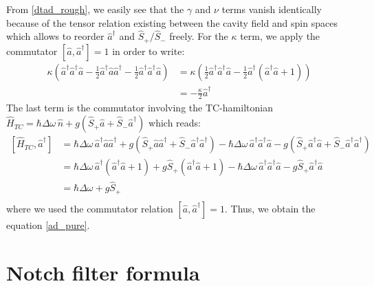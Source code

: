 \documentclass[10pt]{report}
\begin{document}
From \ref{dtad_rough}, we easily see that the $\gamma$ and $\nu$ terms vanish identically because of the tensor relation existing between the cavity field and spin spaces which allows to reorder $\hat{a}^\dag$ and $\hat{S}_+ / \hat{S}_-$ freely. For the $\kappa$ term, we apply the commutator $\left[ \hat{a}, \hat{a}^\dagger \right] = 1$ in order to write:
\begin{equation}
\begin{split}
\kappa \left( \hat{a}^\dagger \hat{a}^\dagger \hat{a} - \frac{1}{2} \hat{a}^\dagger \hat{a} \hat{a}^\dagger - \frac{1}{2} \hat{a}^\dagger \hat{a}^\dagger \hat{a} \right) &= \kappa \left( \frac{1}{2}\hat{a}^\dagger \hat{a}^\dagger \hat{a} - \frac{1}{2} \hat{a}^\dagger (\hat{a}^\dagger \hat{a} + 1) \right)\\
&= -\frac{\kappa}{2} \hat{a}^\dagger
\end{split}
\end{equation}
The last term is the commutator involving the TC-hamiltonian $\hat{H}_{TC} = \hbar\Delta\omega\,\hat{n} + g \left(\hat{S}_+ \hat{a} + \hat{S}_-\hat{a}^{\dag} \right)$ which reads:
\begin{equation}
\begin{split}
\left[ \hat{H}_{TC}, \hat{a}^\dag \right] &= \hbar\Delta\omega\,\hat{a}^\dag\hat{a}\hat{a}^\dag + g\left(\hat{S}_+ \hat{a}\hat{a}^\dag + \hat{S}_-\hat{a}^{\dag}\hat{a}^\dag \right) - \hbar\Delta\omega\,\hat{a}^\dag\hat{a}^\dag\hat{a} - g\left(\hat{S}_+ \hat{a}^\dag\hat{a} + \hat{S}_-\hat{a}^{\dag}\hat{a}^\dag \right) \\
&= \hbar\Delta\omega\,\hat{a}^\dag(\hat{a}^\dag\hat{a} + 1) + g\hat{S}_+ (\hat{a}^\dag\hat{a} + 1) - \hbar\Delta\omega\,\hat{a}^\dag\hat{a}^\dag\hat{a} - g\hat{S}_+ \hat{a}^\dag\hat{a} \\
&= \hbar\Delta\omega + g\hat{S}_+ \\
\end{split}
\end{equation}
where we used the commutator relation $\left[ \hat{a}, \hat{a}^\dagger \right] = 1$. Thus, we obtain the equation \ref{ad_pure}.

\section{Notch filter formula}
\label{notch_filter_formula}
\end{document}
